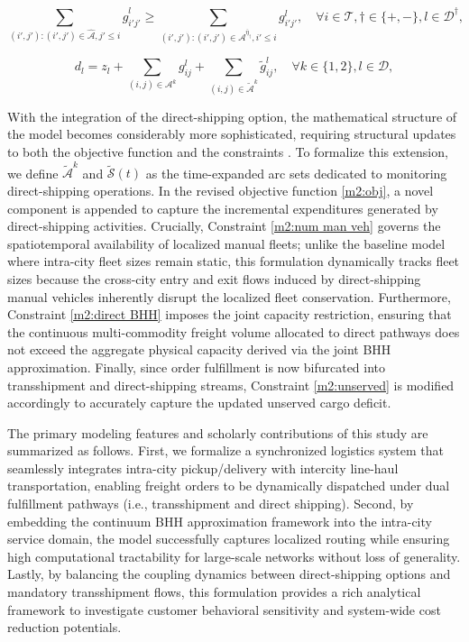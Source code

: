 \documentclass[10pt, reqno]{amsart}
\begin{document}
\begin{equation}
\sum_{(i',j') : (i',j') \in \hat{\mathcal{A}}, j' \le i} \hat{g}_{i'j'}^l \ge \sum_{(i',j') : (i',j') \in \mathcal{A}^{\bar{\eta}_{\dagger}}, i' \le i} g_{i'j'}^l, \quad \forall i \in \mathcal{T}, \dagger \in \{+,-\}, l \in \mathcal{D}^{\dagger},\label{m2:transfer step 2}
\end{equation}

\begin{equation}
d_l = z_l + \sum_{(i,j) \in \mathcal{A}^k} g_{ij}^l+\sum_{(i,j)\in\tilde{\mathcal{A}}^k}\tilde{g}^l_{ij}, \quad \forall k \in \{1,2\}, l \in \mathcal{D},\label{m2:unserved}
\end{equation}

With the integration of the direct-shipping option, the mathematical structure of the model becomes considerably more sophisticated, requiring structural updates to both the objective function and the constraints . To formalize this extension, we define $\tilde{\mathcal{A}}^k$ and $\tilde{\mathcal{S}}(t)$ as the time-expanded arc sets dedicated to monitoring direct-shipping operations. In the revised objective function \eqref{m2:obj}, a novel component is appended to capture the incremental expenditures generated by direct-shipping activities. Crucially, Constraint \eqref{m2:num man veh} governs the spatiotemporal availability of localized manual fleets; unlike the baseline model where intra-city fleet sizes remain static, this formulation dynamically tracks fleet sizes because the cross-city entry and exit flows induced by direct-shipping manual vehicles inherently disrupt the localized fleet conservation. Furthermore, Constraint \eqref{m2:direct BHH} imposes the joint capacity restriction, ensuring that the continuous multi-commodity freight volume allocated to direct pathways does not exceed the aggregate physical capacity derived via the joint BHH approximation. Finally, since order fulfillment is now bifurcated into transshipment and direct-shipping streams, Constraint \eqref{m2:unserved} is modified accordingly to accurately capture the updated unserved cargo deficit.

The primary modeling features and scholarly contributions of this study are summarized as follows. First, we formalize a synchronized logistics system that seamlessly integrates intra-city pickup/delivery with intercity line-haul transportation, enabling freight orders to be dynamically dispatched under dual fulfillment pathways (i.e., transshipment and direct shipping). Second, by embedding the continuum BHH approximation framework into the intra-city service domain, the model successfully captures localized routing while ensuring high computational tractability for large-scale networks without loss of generality. Lastly, by balancing the coupling dynamics between direct-shipping options and mandatory transshipment flows, this formulation provides a rich analytical framework to investigate customer behavioral sensitivity and system-wide cost reduction potentials.
\end{document}

